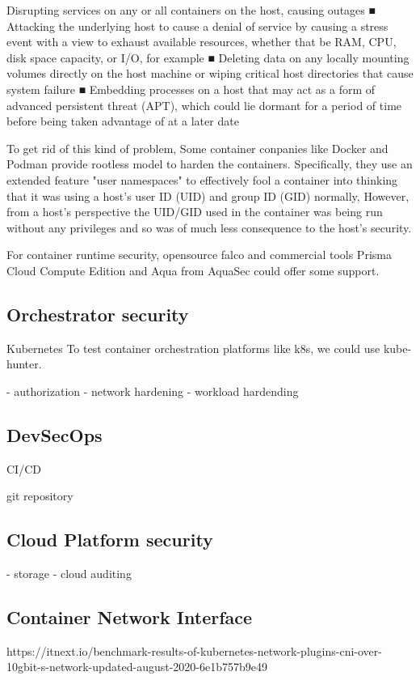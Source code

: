\documentclass[12pt, draftclsnofoot, onecolumn]{IEEEtran}
\begin{document}
Disrupting services on any or all containers on the host, causing outages
■ Attacking the underlying host to cause a denial of service by causing a stress event with a view to exhaust available resources, whether that be RAM, CPU, disk space capacity, or I/O, for example
■ Deleting data on any locally mounting volumes directly on the host machine or wiping critical host directories that cause system failure
■ Embedding processes on a host that may act as a form of advanced persistent threat (APT), which could lie dormant for a period of time before being taken advantage of at a later date

To get rid of this kind of problem, Some container conpanies like Docker and Podman provide rootless model to harden the containers. Specifically, they use an extended feature "user namespaces" to effectively fool a container into thinking that it was using a host’s user ID (UID) and group ID (GID) normally, However, from a host’s perspective the UID/GID used in the container was being run without any privileges and so was of much less consequence to the host’s security.

For container runtime security, opensource falco and commercial tools Prisma Cloud Compute Edition and Aqua from AquaSec could offer some support. 





\subsection{Orchestrator security}
Kubernetes 
To test container orchestration platforms like k8s, we could use kube-hunter. 

- authorization
- network hardening
- workload hardending


\subsection{DevSecOps}
CI/CD 

git repository 

\subsection{Cloud Platform security}
- storage
- cloud auditing 




\subsection{Container Network Interface}
https://itnext.io/benchmark-results-of-kubernetes-network-plugins-cni-over-10gbit-s-network-updated-august-2020-6e1b757b9e49
\end{document}
